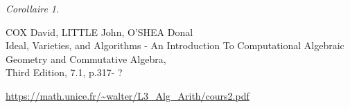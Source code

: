 \documentclass[12pt]{article}
\theoremstyle{remark}\newtheorem{note}{Note}
\theoremstyle{remark}\newtheorem{nota}{Notation}
\newtheorem{corollaire}{Corollaire}
\theoremstyle{definition}
\begin{document}
\begin{corollaire}

\end{corollaire}





\pagebreak
{}

\begin{thebibliography}{9}
	COX David, LITTLE John, O'SHEA Donal\\
	Ideal, Varieties, and Algorithms - An Introduction To Computational Algebraic Geometry and Commutative Algebra,\\
	Third Edition,
	7.1, p.317- ?

	\url{https://math.unice.fr/~walter/L3_Alg_Arith/cours2.pdf}	
\end{thebibliography}
\end{document}
